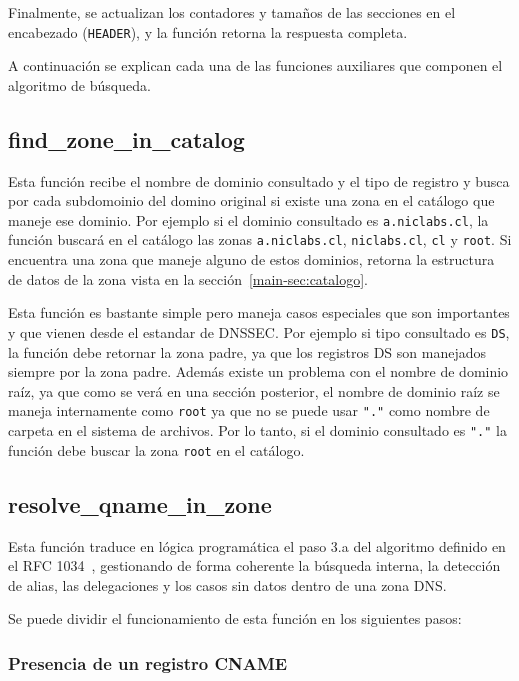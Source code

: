 Finalmente, se actualizan los contadores y tamaños de las secciones en el encabezado (\texttt{HEADER}), y la función retorna la respuesta completa.

A continuación se explican cada una de las funciones auxiliares que componen el algoritmo de búsqueda.

\subsection{find\_zone\_in\_catalog}\label{sec:find-zone}

Esta función recibe el nombre de dominio consultado y el tipo de registro y busca por cada subdomoinio del domino original si existe una zona en el catálogo que maneje ese dominio.
Por ejemplo si el dominio consultado es \texttt{a.niclabs.cl}, la función buscará en el catálogo las zonas \texttt{a.niclabs.cl}, \texttt{niclabs.cl}, \texttt{cl} y \texttt{root}. 
Si encuentra una zona que maneje alguno de estos dominios, retorna la estructura de datos de la zona vista en la sección~\ref{main-sec:catalogo}.

Esta función es bastante simple pero maneja casos especiales que son importantes y que vienen desde el estandar de DNSSEC. Por ejemplo si tipo consultado es \texttt{DS},
la función debe retornar la zona padre, ya que los registros DS son manejados siempre por la zona padre. Además existe un problema con el nombre de dominio raíz, ya que como se verá
en una sección posterior, el nombre de dominio raíz se maneja internamente como \texttt{root} ya que no se puede usar \texttt{"."} como nombre de carpeta en el sistema de archivos. Por lo tanto, si 
el dominio consultado es \texttt{"."} la función debe buscar la zona \texttt{root} en el catálogo.

\subsection{resolve\_qname\_in\_zone} 

Esta función traduce en lógica programática el paso 3.a del algoritmo definido en el RFC 1034~\cite{RFC1034}, gestionando de forma coherente la búsqueda interna, 
la detección de alias, las delegaciones y los casos sin datos dentro de una zona DNS.

Se puede dividir el funcionamiento de esta función en los siguientes pasos:

\subsubsection{Presencia de un registro CNAME}


